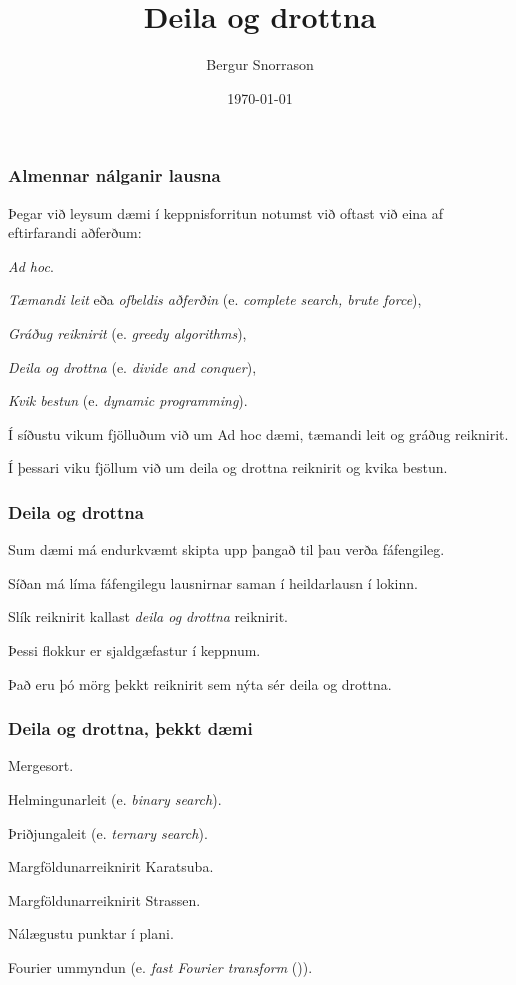 \title{Deila og drottna}
\author{Bergur Snorrason}
\date{\today}



\frame{\titlepage}

{
    \frametitle{Almennar nálganir lausna}
    {
        \item<1-> Þegar við leysum dæmi í keppnisforritun notumst við oftast við eina af eftirfarandi aðferðum:
        {
            \item<2-> \emph{Ad hoc}.
            \item<3-> \emph{Tæmandi leit} eða \emph{ofbeldis aðferðin} (e. \emph{complete search, brute force}),
            \item<4-> \emph{Gráðug reiknirit} (e. \emph{greedy algorithms}),
            \item<5-> \emph{Deila og drottna} (e. \emph{divide and conquer}),
            \item<6-> \emph{Kvik bestun} (e. \emph{dynamic programming}).
        }
        \item<7-> Í síðustu vikum fjölluðum við um Ad hoc dæmi, tæmandi leit og gráðug reiknirit.
        \item<8-> Í þessari viku fjöllum við um deila og drottna reiknirit og kvika bestun.
    }
}

{
    \frametitle{Deila og drottna}
    {
        \item<1-> Sum dæmi má endurkvæmt skipta upp þangað til þau verða fáfengileg.
        \item<2-> Síðan má líma fáfengilegu lausnirnar saman í heildarlausn í lokinn.
        \item<3-> Slík reiknirit kallast \emph{deila og drottna} reiknirit.
        \item<4-> Þessi flokkur er sjaldgæfastur í keppnum.
        \item<5-> Það eru þó mörg þekkt reiknirit sem nýta sér deila og drottna.
    }
}

{
    \frametitle{Deila og drottna, þekkt dæmi}
    {
        \item<1-> Mergesort.
        \item<2-> Helmingunarleit (e. \emph{binary search}).
        \item<3-> Þriðjungaleit (e. \emph{ternary search}).
        \item<4-> Margföldunarreiknirit Karatsuba.
        \item<5-> Margföldunarreiknirit Strassen.
        \item<6-> Nálægustu punktar í plani.
        \item<7-> Fourier ummyndun (e. \emph{fast Fourier transform} ()).
    }
}

